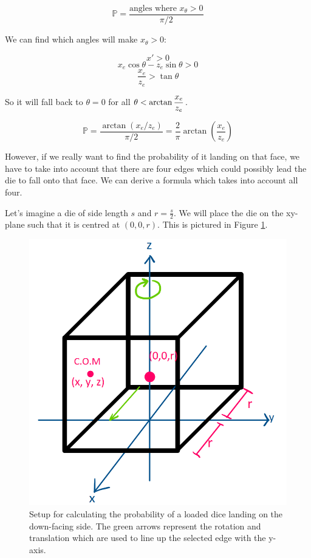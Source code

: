 \documentclass[english,12pt,a4paper,final]{article}
\begin{document}
\begin{equation*}
	 \mathbb{P} = \frac{\text{angles where $x_{\theta} > 0$}}{\pi/2}
\end{equation*}

We can find which angles will make $x_{\theta} > 0$:

\begin{equation*}
	x' > 0
\end{equation*}
\begin{equation*}
	x_e\cos\theta - z_e\sin\theta > 0
\end{equation*}
\begin{equation*}
	\frac{x_e}{z_e} > \tan\theta
\end{equation*}

So it will fall back to $\theta=0$ for all $\theta < \arctan\mathlarger{\frac{x_e}{z_e}}$.

\begin{equation}\label{dieEdgeProb}
	\mathbb{P} = \frac{\arctan(x_e/z_e)}{\pi/2} = \frac{2}{\pi} \arctan\left(\frac{x_e}{z_e}\right)
\end{equation}

However, if we really want to find the probability of it landing on that face, we have to take into account that there are four edges which could possibly lead the die to fall onto that face. We can derive a formula which takes into account all four.

Let's imagine a die of side length $s$ and $r=\frac{s}{2}$. We will place the die on the xy-plane such that it is centred at $(0, 0, r)$. This is pictured in Figure \ref{fig:loadeddie3d}.

\begin{figure}[H]
	\centering
	\includegraphics[width=0.7\linewidth]{loadedDie3d}
	\caption{Setup for calculating the probability of a loaded dice landing on the down-facing side. The green arrows represent the rotation and translation which are used to line up the selected edge with the y-axis.}
	\label{fig:loadeddie3d}
\end{figure}
\end{document}

